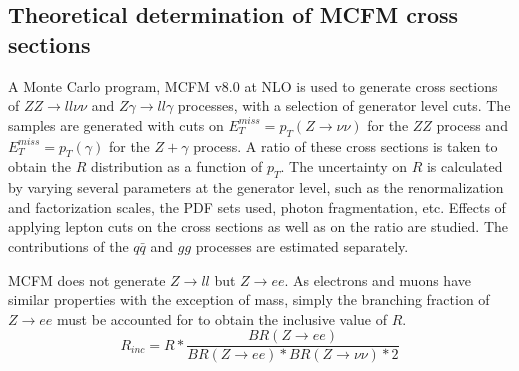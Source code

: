 \documentclass[11pt,a4paper,final]{report}
\newcommand{\ZZ}{$ZZ\to ll\nu\nu$ }
\newcommand{\Zgam}{$Z\gamma\to ll\gamma$ }
\begin{document}
\subsection*{Theoretical determination of MCFM cross sections}
A Monte Carlo program, MCFM v8.0 \cite{MCFM} at NLO is used to generate cross sections of \ZZ and \Zgam processes, with a selection of generator level cuts. The samples are generated with cuts on $E_T^{miss} = p_T(Z\to \nu\nu)$ for the $ZZ$ process and $E_T^{miss} = p_T(\gamma)$ for the $Z+\gamma$ process. A ratio of these cross sections is taken to obtain the $R$ distribution as a function of $p_T$. The uncertainty on $R$ is calculated by varying several parameters at the generator level, such as the renormalization and factorization scales, the PDF sets used, photon fragmentation, etc. Effects of applying lepton cuts on the cross sections as well as on the ratio are studied. The contributions of the $q \bar{q}$ and $gg$ processes are estimated separately.

MCFM does not generate $Z\rightarrow ll$ but $Z\rightarrow ee$. As electrons and muons have similar properties with the exception of mass, simply the branching fraction of $Z\rightarrow ee$ must be accounted for to obtain the inclusive value of $R$.
\begin{equation}\label{eq:R_inc}
	R_{inc} = R * \frac{BR(Z\rightarrow ee)}{BR(Z \rightarrow ee)*BR(Z\rightarrow \nu\nu)*2}
\end{equation}
\end{document}
